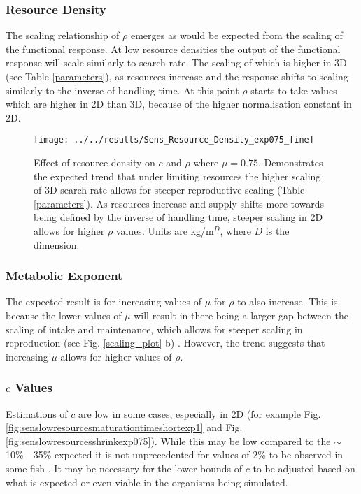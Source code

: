 \documentclass[a4paper, 11pt, hidelinks]{article} %
\begin{document}
	\subsubsection{Resource Density}
	The scaling relationship of $\rho$ emerges as would be expected from the scaling of the functional response.  At low resource densities the output of the functional response will scale similarly to search rate.  The scaling of which is higher in 3D (see Table \ref{parameters}), as resources increase and the response shifts to scaling similarly to the inverse of handling time.  At this point $\rho$ starts to take values which are higher in 2D than 3D, because of the higher normalisation constant in 2D.
	
	\begin{figure}[h]
		\centering
		\texttt{[image: ../../results/Sens\_Resource\_Density\_exp075\_fine]}
		\caption{Effect of resource density on $c$ and $\rho$ where $\mu = 0.75$.  Demonstrates the expected trend that under limiting resources the higher scaling of 3D search rate  allows for steeper reproductive scaling (Table \ref{parameters}).  As resources increase and supply shifts more towards being defined by the inverse of handling time, steeper scaling in 2D allows for higher $\rho$ values.  Units are kg/m$^D$, where $D$ is the dimension.}
		\label{fig:sensresourcedensityexp075fine}
	\end{figure}

	\subsubsection{Metabolic Exponent}
	The expected result is for increasing values of $\mu$ for $\rho$ to also increase.  This is because the lower values of $\mu$ will result in there being a larger gap between the scaling of intake and maintenance, which allows for steeper scaling in reproduction (see Fig. \ref{scaling_plot} b) \parencite{Marshall2019}.  
	However, the trend suggests that increasing $\mu$ allows for higher values of $\rho$.  
		
	\subsubsection{$c$ Values}
	Estimations of $c$ are low in some cases, especially in 2D (for example Fig. \ref{fig:senslowresourcesmaturationtimeshortexp1} and Fig. \ref{fig:senslowresourcesshrinkexp075}).  While this may be low compared to the $\sim$10\% - 35\% expected \parencite{Benoit2018, Fontoura2009, Roff1983, Wootton1985} it is not unprecedented for values of 2\% to be observed in some fish \parencite{Gunderson1997}.  
	It may be necessary for the lower bounds of $c$ to be adjusted based on what is expected or even viable in the organisms being simulated.
		
\end{document}
